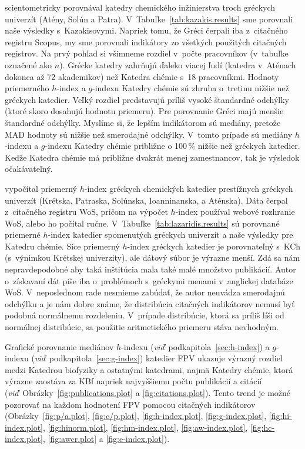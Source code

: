 \citet{Kazakis2015} scientometricky porovnával katedry chemického inžinierstva
troch gréckych univerzít (Atény, Solún a Patra).
V~Tabuľke~\ref{tab:kazakis.results} sme porovnali naše výsledky s~Kazakisovymi.
Napriek tomu, že Gréci čerpali iba z~citačného registru Scopus, my sme porovnali
indikátory zo všetkých použitých citačných registrov.  Na prvý pohľad si
všimneme rozdiel v~počte pracovníkov (v~tabuľke označené ako $n$).  Grécke
katedry zahrňujú ďaleko viacej ľudí (katedra v~Aténach dokonca až 72 akademikov)
než Katedra chémie s~18 pracovníkmi.  Hodnoty priemerného $h$-index a $g$-indexu
Katedry chémie sú zhruba o~tretinu nižšie než gréckych katedier.  Veľký rozdiel
predstavujú príliš vysoké štandardné odchýlky (ktoré skoro dosahujú hodnotu
priemeru).  Pre porovnanie Gréci majú menšie štandardné odchýlky.  Myslíme si,
že lepším indikátorom sú mediány, pretože MAD hodnoty sú nižšie než smerodajné
odchýlky.  V~tomto prípade sú mediány $h$-indexu a $g$-indexu Katedry chémie
približne o 100\,\% nižšie než gréckych katedier.  Keďže Katedra chémie má
približne dvakrát menej zamestnancov, tak je výsledok očakávateľný.

\citet{Lazaridis2010} vypočítal priemerný $h$-index gréckych chemických katedier
prestížnych gréckych univerzít (Krétska, Patraska, Solúnska, Ioanninanska, a
Aténska).  Dáta čerpal z~citačného registru WoS, pričom na výpočet $h$-index
používal webové rozhranie WoS, alebo ho počítal ručne.
V~Tabuľke~\ref{tab:lazaridis.results} sú porovnané priemerné $h$-index katedier
spomenutých gréckych univerzít a naše výsledky pre Katedru chémie.  Síce
priemerný $h$-index gréckych katedier je porovnateľný s~KCh (s~výnimkou Krétskej
univerzity), ale dátový súbor je výrazne menší.  Zdá sa nám nepravdepodobné aby
taká inštitúcia mala také malé množstvo publikácií.  Autor o~získavaní dát píše
iba o~problémoch s~gréckymi menami v~anglickej databáze WoS.  V~neposlednom rade
nesmieme zabúdať, že autor neuvádza smerodajnú odchýlku a je nám dobre známe, že
distribúcia citačných indikátorov nemusí byť podobná normálnemu rozdeleniu.
V~prípade distribúcie, ktorá sa príliš líši od normálnej distribúcie, sa
použitie aritmetického priemeru stáva nevhodným.

Grafické porovnanie mediánov $h$-indexu
(\emph{viď}~podkapitola~\ref{sec:h-index}) a $g$-indexu
(\emph{viď}~podkapitola~\ref{sec:g-index}) katedier FPV ukazuje výrazný rozdiel
medzi Katedrou biofyziky a ostatnými katedrami, najmä Katedry chémie, ktorá
výrazne zaostáva za KBf napriek najvyššiemu počtu publikácií a citácií
(\emph{viď}~Obrázky~\ref{fig:publications.plot} a \ref{fig:citations.plot}).
Tento trend je možné pozorovať na každom hodnotení FPV pomocou citačných
indikátorov (Obrázky~\ref{fig:p/a.plot}, \ref{fig:c/p.plot},
\ref{fig:h-index.plot}, \ref{fig:g-index.plot}, \ref{fig:hi-index.plot},
\ref{fig:hinorm.plot}, \ref{fig:hm-index.plot}, \ref{fig:aw-index.plot},
\ref{fig:hc-index.plot}, \ref{fig:awcr.plot} a \ref{fig:e-index.plot}).


